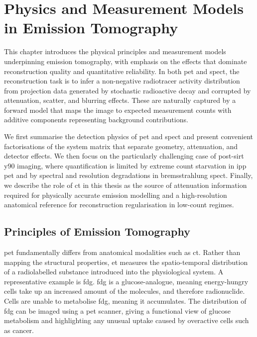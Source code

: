 \chapter{Physics and Measurement Models in Emission Tomography}
\label{chap:intro_material}

This chapter introduces the physical principles and measurement models underpinning emission tomography, with emphasis on the effects that dominate reconstruction quality and quantitative reliability. In both \acrfull{pet} and \acrfull{spect}, the reconstruction task is to infer a non-negative radiotracer activity distribution from projection data generated by stochastic radioactive decay and corrupted by attenuation, scatter, and blurring effects. These are naturally captured by a forward model that maps the image to expected measurement counts with additive components representing background contributions.

We first summarise the detection physics of \gls{pet} and \gls{spect} and present convenient factorisations of the system matrix that separate geometry, attenuation, and detector effects. We then focus on the particularly challenging case of post-\gls{sirt} \gls{y90} imaging, where quantification is limited by extreme count starvation in \acrfull{ipp} \gls{pet} and by spectral and resolution degradations in bremsstrahlung \gls{spect}. Finally, we describe the role of \acrfull{ct} in this thesis as the source of attenuation information required for physically accurate emission modelling and a high-resolution anatomical reference for reconstruction regularisation in low-count regimes.

\section{Principles of Emission Tomography}

\gls{pet} fundamentally differs from anatomical modalities such as \gls{ct}. Rather than mapping the structural properties, \gls{et} measures the spatio-temporal distribution of a radiolabelled substance introduced into the physiological system. A representative example is \gls{fdg}\cite{boellaardFDGPETCT2015}. \gls{fdg} is a glucose-analogue, meaning energy-hungry cells take up an increased amount of the molecules, and therefore radionuclide. Cells are unable to metabolise \gls{fdg}, meaning it accumulates. The distribution of \gls{fdg} can be imaged using a \gls{pet} scanner, giving a functional view of glucose metabolism and highlighting any unusual uptake caused by overactive cells such as cancer.

